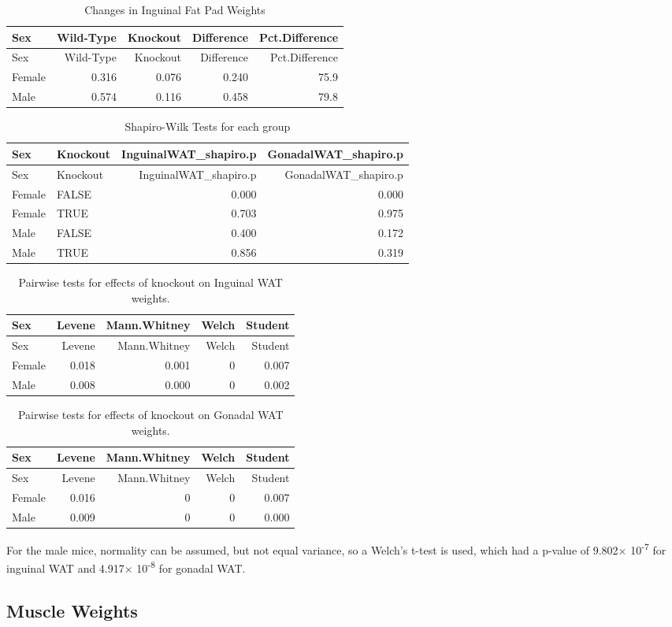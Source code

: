 \documentclass[]{article}
\begin{document}
\begin{longtable}[]{@{}lrrrr@{}}
\caption{Changes in Inguinal Fat Pad Weights}\tabularnewline
\toprule
Sex & Wild-Type & Knockout & Difference & Pct.Difference\tabularnewline
\midrule
\endfirsthead
\toprule
Sex & Wild-Type & Knockout & Difference & Pct.Difference\tabularnewline
\midrule
\endhead
Female & 0.316 & 0.076 & 0.240 & 75.9\tabularnewline
Male & 0.574 & 0.116 & 0.458 & 79.8\tabularnewline
\bottomrule
\end{longtable}

\begin{longtable}[]{@{}llrr@{}}
\caption{Shapiro-Wilk Tests for each group}\tabularnewline
\toprule
Sex & Knockout & InguinalWAT\_shapiro.p &
GonadalWAT\_shapiro.p\tabularnewline
\midrule
\endfirsthead
\toprule
Sex & Knockout & InguinalWAT\_shapiro.p &
GonadalWAT\_shapiro.p\tabularnewline
\midrule
\endhead
Female & FALSE & 0.000 & 0.000\tabularnewline
Female & TRUE & 0.703 & 0.975\tabularnewline
Male & FALSE & 0.400 & 0.172\tabularnewline
Male & TRUE & 0.856 & 0.319\tabularnewline
\bottomrule
\end{longtable}

\begin{longtable}[]{@{}lrrrr@{}}
\caption{Pairwise tests for effects of knockout on Inguinal WAT
weights.}\tabularnewline
\toprule
Sex & Levene & Mann.Whitney & Welch & Student\tabularnewline
\midrule
\endfirsthead
\toprule
Sex & Levene & Mann.Whitney & Welch & Student\tabularnewline
\midrule
\endhead
Female & 0.018 & 0.001 & 0 & 0.007\tabularnewline
Male & 0.008 & 0.000 & 0 & 0.002\tabularnewline
\bottomrule
\end{longtable}

\begin{longtable}[]{@{}lrrrr@{}}
\caption{Pairwise tests for effects of knockout on Gonadal WAT
weights.}\tabularnewline
\toprule
Sex & Levene & Mann.Whitney & Welch & Student\tabularnewline
\midrule
\endfirsthead
\toprule
Sex & Levene & Mann.Whitney & Welch & Student\tabularnewline
\midrule
\endhead
Female & 0.016 & 0 & 0 & 0.007\tabularnewline
Male & 0.009 & 0 & 0 & 0.000\tabularnewline
\bottomrule
\end{longtable}

For the male mice, normality can be assumed, but not equal variance, so
a Welch's t-test is used, which had a p-value of 9.802×
10\textsuperscript{-7} for inguinal WAT and 4.917×
10\textsuperscript{-8} for gonadal WAT.

\subsection{Muscle Weights}\label{muscle-weights}
\end{document}
